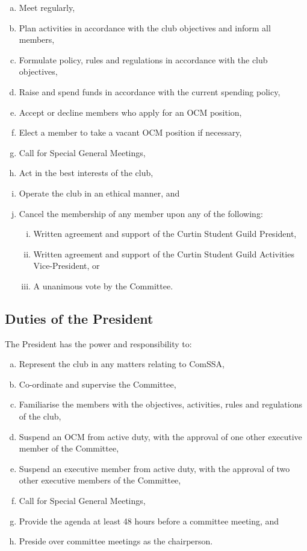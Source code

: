 \documentclass[a4paper,12pt]{article}
\begin{document}
\begin{enumerate}[a)]
	\item Meet regularly,
	\item Plan activities in accordance with the club objectives and inform all members,
	\item Formulate policy, rules and regulations in accordance with the club objectives,
	\item Raise and spend funds in accordance with the current spending policy,
	\item Accept or decline members who apply for an OCM position,
	\item Elect a member to take a vacant OCM position if necessary,
	\item Call for Special General Meetings,
	\item Act in the best interests of the club,
	\item Operate the club in an ethical manner, and
	\item Cancel the membership of any member upon any of the following:
	\begin{enumerate}[i)]
		\item Written agreement and support of the Curtin Student Guild President,
		\item Written agreement and support of the Curtin Student Guild Activities Vice-President, or
		\item A unanimous vote by the Committee.
	\end{enumerate}
\end{enumerate}

\subsection{Duties of the President}

The President has the power and responsibility to:

\begin{enumerate}[a)]
	\item Represent the club in any matters relating to ComSSA,
	\item Co-ordinate and supervise the Committee,
	\item Familiarise the members with the objectives, activities, rules and regulations of the club,
	\item Suspend an OCM from active duty, with the approval of one other executive member of the Committee,
	\item Suspend an executive member from active duty, with the approval of two other executive members of the Committee,
	\item Call for Special General Meetings,
	\item Provide the agenda at least 48 hours before a committee meeting, and
	\item Preside over committee meetings as the chairperson.
\end{enumerate}
\end{document}
